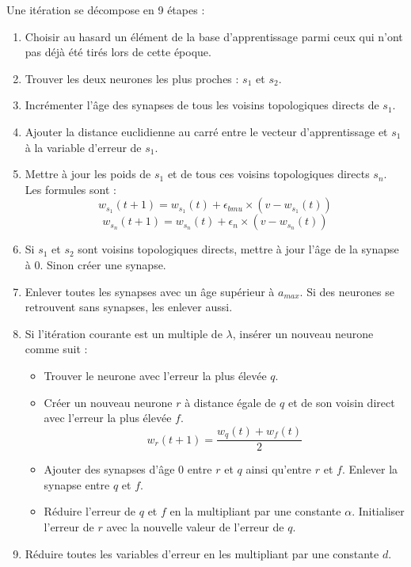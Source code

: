 	Une itération se décompose en 9 étapes :
	\begin{enumerate}
		\item Choisir au hasard un élément de la base d'apprentissage parmi ceux qui n'ont pas déjà été tirés lors de cette époque.
		\item Trouver les deux neurones les plus proches : $s_1$ et $s_2$.
		\item Incrémenter l'âge des synapses de tous les voisins topologiques directs de $s_1$.
		\item Ajouter la distance euclidienne au carré entre le vecteur d'apprentissage et $s_1$ à la variable d'erreur de $s_1$.
		\item Mettre à jour les poids de $s_1$ et de tous ces voisins topologiques directs $s_n$. Les formules sont :
		\begin{equation}
			w_{s_1}(t+1) = w_{s_1}(t) + \epsilon_{\textit{bmu}} \times (v - w_{s_1}(t))
		\end{equation}
		\begin{equation}
			w_{s_n}(t+1) = w_{s_n}(t) + \epsilon_{n} \times (v - w_{s_n}(t))
		\end{equation}
		\item Si $s_1$ et $s_2$ sont voisins topologiques directs, mettre à jour l'âge de la synapse à 0. Sinon créer une synapse.
		\item Enlever toutes les synapses avec un âge supérieur à $a_{\textit{max}}$. Si des neurones se retrouvent sans synapses, les enlever aussi.
		\item Si l'itération courante est un multiple de $\lambda$, insérer un nouveau neurone comme suit :
		\begin{itemize}
			\item Trouver le neurone avec l'erreur la plus élevée $q$.
			\item Créer un nouveau neurone $r$ à distance égale de $q$ et de son voisin direct avec l'erreur la plus élevée $f$.
			\begin{equation}
				w_r(t+1) = \frac{w_q(t) + w_f(t)}{2}  
			\end{equation}
			\item Ajouter des synapses d'âge 0 entre $r$ et $q$ ainsi qu'entre $r$ et $f$. Enlever la synapse entre $q$ et $f$.
			\item Réduire l'erreur de $q$ et $f$ en la multipliant par une constante $\alpha$. Initialiser l'erreur de $r$ avec la nouvelle valeur de l'erreur de $q$.
		\end{itemize}
		\item Réduire toutes les variables d'erreur en les multipliant par une constante $d$.
	\end{enumerate}\text{\\}

